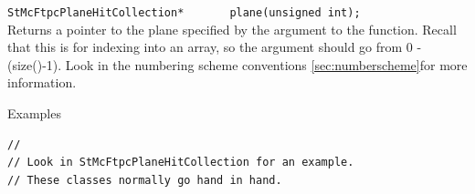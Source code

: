 \begin{Entry}
    \verb+StMcFtpcPlaneHitCollection*       plane(unsigned int);+\\
    Returns a pointer to the plane specified by the argument to the
    function.  Recall that this is for indexing into an array, so the
    argument should go from 0 - (size()-1).  Look in the
    numbering scheme conventions \ref{sec:numberscheme}for more information.

\item[Examples]
{\footnotesize
\begin{verbatim}
//
// Look in StMcFtpcPlaneHitCollection for an example.
// These classes normally go hand in hand.
\end{verbatim}
}%
\end{Entry}

\clearpage
%
%
